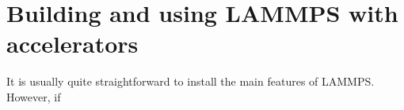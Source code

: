 \chapter{Building and using LAMMPS with accelerators} 
It is usually quite straightforward to install the main features of LAMMPS. However, if 